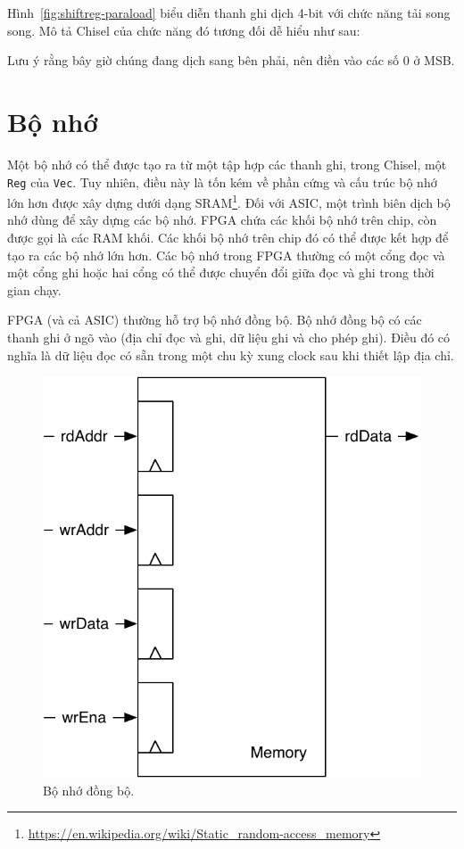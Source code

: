 \documentclass[%
    10pt,
    headinclude, footexclude,
    openright, %
    notitlepage,
    cleardoubleempty,
    headsepline,
    pointlessnumbers,
    bibtotoc, idxtotoc,
    ]{scrbook}
\newcommand{\code}[1]{{\small{\texttt{#1}}}}
\newcommand{\scale}{0.7}
\newcommand{\myref}[2]{\href{#1}{#2}}
\renewcommand{\myref}[2]{{#2}{\footnote{\url{#1}}}}
\begin{document}
Hình~\ref{fig:shiftreg-paraload} biểu diễn thanh ghi dịch 4-bit với chức năng tải song song.
Mô tả Chisel của chức năng đó tương đối dễ hiểu như sau:


Lưu ý rằng bây giờ chúng đang dịch sang bên phải, nên điền vào các số 0 ở MSB. 

\section{Bộ nhớ}

Một bộ nhớ có thể được tạo ra từ một tập hợp các thanh ghi, trong Chisel, một \code{Reg} của \code{Vec}.
Tuy nhiên, điều này là tốn kém về phần cứng và cấu trúc bộ nhớ lớn hơn được xây dựng dưới 
dạng \myref{https://en.wikipedia.org/wiki/Static_random-access_memory}{SRAM}.
Đối với ASIC, một trình biên dịch bộ nhớ dùng để xây dựng các bộ nhớ.
FPGA chứa các khối bộ nhớ trên chip, còn được gọi là các RAM khối.
Các khối bộ nhớ trên chip đó có thể được kết hợp để tạo ra các bộ nhớ lớn hơn.
Các bộ nhớ trong FPGA thường có một cổng đọc và một cổng ghi hoặc hai cổng có thể 
được chuyển đổi giữa đọc và ghi trong thời gian chạy. 

FPGA (và cả ASIC) thường hỗ trợ bộ nhớ đồng bộ.
Bộ nhớ đồng bộ có các thanh ghi ở ngõ vào (địa chỉ đọc và ghi, dữ liệu ghi và cho phép ghi). 
Điều đó có nghĩa là dữ liệu đọc có sẵn trong một chu kỳ xung clock sau khi thiết lập địa chỉ. 

\begin{figure}
  \centering
  \includegraphics[scale=\scale]{figures/memory}
  \caption{Bộ nhớ đồng bộ.}
  \label{fig:memory}
\end{figure}
\end{document}
